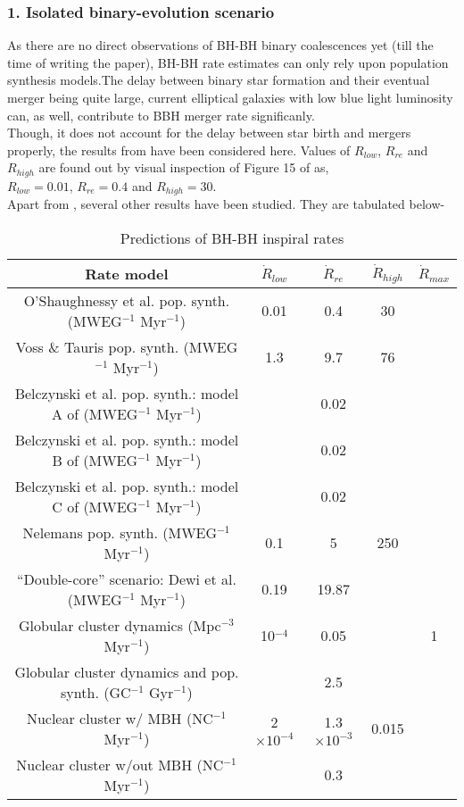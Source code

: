 \documentclass{article}
\numberwithin{equation}{section}
\begin{document}
\subsubsection*{1. Isolated binary-evolution scenario}
As there are no direct observations of BH-BH binary coalescences yet (till the time of writing the paper), BH-BH rate estimates can only rely upon population synthesis models.The delay between binary star formation and their eventual merger being quite large, current elliptical galaxies with low blue light luminosity can, as well, contribute to BBH merger rate significanly.\\
Though, it does not account for the delay between star birth and mergers properly, the results from \cite{14} have been considered here. Values of $R_{low}$, $R_{re}$ and $R_{high}$ are found out by visual inspection of Figure 15 of \cite{14} as,\\
$R_{low} = 0.01$, $R_{re} = 0.4$ and $R_{high} = 30$.\\
Apart from \cite{14}, several other results have been studied. They are tabulated below-

\begin{table}[h!]
	\centering
	\caption{Predictions of BH-BH inspiral rates}
	\label{tab:table4}
	\begin{tabular}{ccccc}
		\toprule
		Rate model & $\dot{R}_{low}$ & $\dot{R}_{re}$ & $\dot{R}_{high}$ & $\dot{R}_{max}$\\
		
		\midrule
		O’Shaughnessy et al. pop. synth. \cite{14} (MWEG$^{-1}$ Myr$^{-1}$) 			& 0.01 & 0.4 & 30 &\\
		Voss \& Tauris pop. synth. \cite{34} (MWEG$^{-1}$ Myr$^{-1}$)					& 1.3 & 9.7 & 76 &\\
		Belczynski et al. pop. synth.: model A of \cite{35} (MWEG$^{-1}$ Myr$^{-1}$) 	& & 0.02 & & \\
		Belczynski et al. pop. synth.: model B of \cite{35} (MWEG$^{-1}$ Myr$^{-1}$) 	& & 0.02 & & \\
		Belczynski et al. pop. synth.: model C of \cite{35} (MWEG$^{-1}$ Myr$^{-1}$) 	& & 0.02 & & \\
		Nelemans pop. synth. \cite{36} (MWEG$^{-1}$ Myr$^{-1}$) 						& 0.1 & 5 & 250 & \\
		“Double-core” scenario: Dewi et al. \cite{37} (MWEG$^{-1}$ Myr$^{-1}$)			& 0.19 & 19.87 & &\\
		Globular cluster dynamics \cite{55} (Mpc$^{-3}$ Myr$^{-1}$)						& 10$^{-4}$ & 0.05 & & 1\\
		Globular cluster dynamics and pop. synth. \cite{42} (GC$^{-1}$ Gyr$^{-1}$) 		& & 2.5 & & \\
		Nuclear cluster w/ MBH \cite{56} (NC$^{-1}$ Myr$^{-1}$)							& 2$\times10^{-4}$ & 1.3$\times10^{-3}$ & 0.015 &\\
		Nuclear cluster w/out MBH \cite{57} (NC$^{-1}$ Myr$^{-1}$)						& & 0.3 & &\\
		\bottomrule
	\end{tabular}
\end{table}
\end{document}
